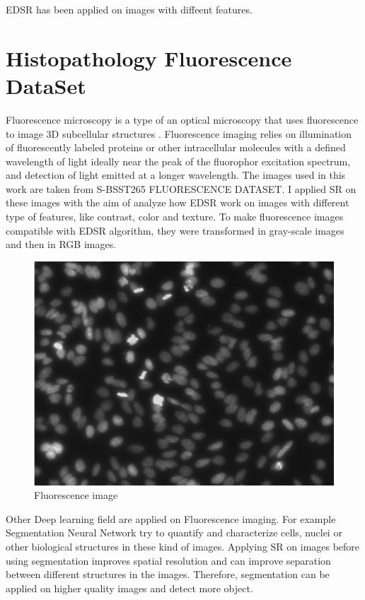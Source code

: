 \documentclass[a4paper, 10pt]{book}
\begin{document}
EDSR  has been applied on images with diffeent features. 
\section{Histopathology Fluorescence DataSet}
Fluorescence microscopy is a type of an optical microscopy that uses fluorescence to image 3D subcellular
structures .
Fluorescence imaging relies on illumination of fluorescently labeled proteins or other intracellular molecules with a defined wavelength of light ideally near the peak of the fluorophor excitation spectrum, and detection of light emitted at a longer wavelength.
The images used in this work are taken from
S-BSST265 FLUORESCENCE DATASET.
I applied SR on these images with the aim of analyze how EDSR work on images with  different type of features, like contrast, color and texture.
To make fluorescence images compatible with EDSR algorithm, they were transformed in gray-scale images and then in RGB images.
\begin{figure}[H]
    \centering
    \includegraphics[scale=0.5]{c304a1fdf3bca2f4b4580d2cac59942e2224a7678001bf5ed9d9852f57708932.jpeg}
    \caption{Fluorescence image}
    \label{fig:Fluorescence}
\end{figure}
Other Deep learning field are applied on Fluorescence imaging. For example Segmentation Neural Network try  to quantify and characterize cells, nuclei or other biological
structures in these kind of images.
Applying SR on images before using segmentation improves spatial resolution and can improve separation between different structures in the images. Therefore, segmentation can be applied on higher quality images and detect more object.
\end{document}
